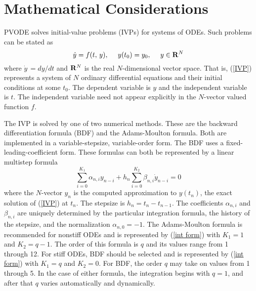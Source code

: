 \section{Mathematical Considerations}

PVODE solves initial-value problems (IVPs) for systems of ODEs. Such
problems can be stated as
\begin{equation}
\dot{y} = f(t,\,y) , ~~~~ y(t_0) = y_0 , ~~~~ y \in {\bf R}^N
                   \label{IVP}
\end{equation}
where $\dot{y}\,=dy/dt$ and ${\bf R}^N$ is the real $N$-dimensional
vector space. That is, (\ref{IVP}) represents a system of $N$ ordinary
differential equations and their initial conditions at some $t_0$. The
dependent variable is $y$ and the independent variable is $t$. The
independent variable need not appear explicitly in the $N$-vector valued
function $f$.

The IVP is solved by one of two numerical methods. These are the
backward differentiation formula (BDF) and the Adams-Moulton formula. Both
are implemented in a variable-stepsize, variable-order form. The BDF
uses a fixed-leading-coefficient form. These formulas can both be
represented by a linear multistep formula 
\begin{equation}
\sum_{i=0}^{K_1}\alpha_{n,i}y_{n-i} + h_n\sum_{i=0}^{K_2}\beta_{n,i} 
\dot{y}_{n-i}=0  \label{int form}
\end{equation}
where the $N$-vector $y_n$ is the computed approximation to $y(t_n)$,
the exact solution of (\ref{IVP}) at $t_n$. The stepsize is
$h_n=t_n-t_{n-1}$.  The coefficients $\alpha_{n,i}$ and $\beta_{n,i}$
are uniquely determined by the particular integration formula, the
history of the stepsize, and the normalization $\alpha_{n,0}=-1$. The
Adams-Moulton formula is recommended for nonstiff ODEs and is
represented by (\ref{int form}) with $K_1=1$ and $K_2=q-1$. The order
of this formula is $q$ and its values range from 1 through 12. For
stiff ODEs, BDF should be selected and is represented by 
(\ref{int form}) with $K_1=q$ and $K_2=0$. For BDF, the order $q$ may
take on values from 1 through 5. In the case of either formula, the
integration begins with $q=1$, and after that $q$ varies automatically
and dynamically.

